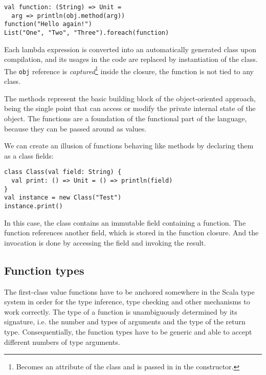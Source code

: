 \lstset{style=Scala}
\begin{lstlisting}
val function: (String) => Unit = 
  arg => println(obj.method(arg))
function("Hello again!")
List("One", "Two", "Three").foreach(function)
\end{lstlisting}

Each lambda expression is converted into an automatically generated class upon compilation, and its usages in the code are replaced by instantiation of the class. The \lstinline|obj| reference is \textit{captured}\footnote{Becomes an attribute of the class and is passed in in the constructor.} inside the closure, the function is not tied to any class. 

The methods represent the basic building block of the object-oriented approach, being the single point that can access or modify the private internal state of the object. The functions are a foundation of the functional part of the language, because they can be passed around as values.

We can create an illusion of functions behaving like methods by declaring them as a class fields:

\lstset{style=Scala}
\begin{lstlisting}
class Class(val field: String) {
  val print: () => Unit = () => println(field)
}
val instance = new Class("Test")
instance.print()
\end{lstlisting}

In this case, the class contains an immutable field  containing a function. The function references another field, which is stored in the function closure. And the invocation is done by accessing the  field and invoking the result.


\subsection{Function types}
\label{subsec:functiontypes}

The first-class value functions have to be anchored somewhere in the Scala type system in order for the type inference, type checking and other mechanisms to work correctly. The type of a function is unambiguously determined by its signature, i.e. the number and types of arguments and the type of the return type. Consequentially, the function types have to be generic and able to accept different numbers of type arguments.

